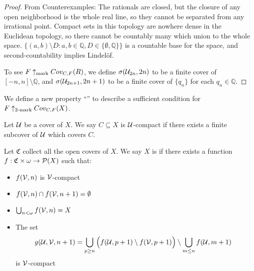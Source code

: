   \begin{proof}
  From Counterexamples: The rationals are closed, but the closure of any open neighborhood is the whole real line, so they cannot be separated from any irrational point. Compact sets in this topology are nowhere dense in the Euclidean topology, so there cannot be countably many which union to the whole space. $\{(a,b)\setminus D : a,b\in\mathbb{Q},D\in\{\emptyset,\mathbb{Q}\}\}$ is a countable base for the space, and second-countability implies Lindel\"of.


  To see $F \uparrow_{\text{mark}} Cov_{C,F}(R)$, we define $\sigma(\mathcal{U}_{2n},2n)$ to be a finite cover of $[-n,n]\setminus\mathbb{Q}$, and $\sigma(\mathcal{U}_{2n+1},2n+1)$ to be a finite cover of $\{q_n\}$ for each $q_n\in\mathbb{Q}$.
  \end{proof}

  We define a new property ``\scish'' to describe a sufficient condition for $F \uparrow_{2\text{-mark}}Cov_{C,F}(X)$.

  \begin{definition}
    Let $\mathcal{U}$ be a cover of $X$. We say $C\subseteq X$ is $\mathcal{U}$-compact if there exists a finite subcover of $\mathcal{U}$ which covers $C$.

    Let $\mathfrak{C}$ collect all the open covers of $X$. We say $X$ is \scish if there exists a function $f:\mathfrak{C}\times\omega\to\mathcal{P}(X)$ such that:
      \begin{itemize}
        \item $f(\mathcal{V},n)$ is $\mathcal{V}$-compact
        \item $f(\mathcal{V},n)\cap f(\mathcal{V},n+1) = \emptyset$
        \item $\bigcup_{n<\omega}f(\mathcal{V},n)=X$
        \item The set
          \[
            g(\mathcal{U},\mathcal{V},n+1) = \bigcup_{p\geq n} \Big(f(\mathcal{U},p+1)\setminus f(\mathcal{V},p+1)\Big)\setminus \bigcup_{m\leq n}f(\mathcal{U},m+1)
          \]
         is $\mathcal{V}$-compact
      \end{itemize}
  \end{definition}

